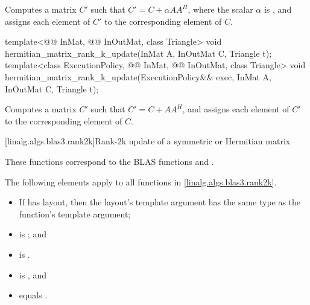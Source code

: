\begin{itemdescr}
\pnum
\effects
Computes a matrix $C'$ such that $C' = C + \alpha A A^H$,
where the scalar $\alpha$ is ,
and assigns each element of $C'$ to the corresponding element of $C$.
\end{itemdescr}

\begin{itemdecl}
template<@@ InMat, @@ InOutMat, class Triangle>
  void hermitian_matrix_rank_k_update(InMat A, InOutMat C, Triangle t);
template<class ExecutionPolicy,
         @@ InMat, @@ InOutMat, class Triangle>
  void hermitian_matrix_rank_k_update(ExecutionPolicy&& exec,
                                      InMat A, InOutMat C, Triangle t);
\end{itemdecl}

\begin{itemdescr}
\pnum
\effects
Computes a matrix $C'$ such that $C' = C + A A^H$, and
assigns each element of $C'$ to the corresponding element of $C$.
\end{itemdescr}

[linalg.algs.blas3.rank2k]{Rank-2k update of a symmetric or Hermitian matrix}

\pnum
\begin{note}
These functions correspond to the BLAS functions
 and \supercite{blas3}.
\end{note}

\pnum
The following elements apply to all functions in \ref{linalg.algs.blas3.rank2k}.

\pnum
\mandates
\begin{itemize}
\item
If  has  layout,
then the layout's  template argument has
the same type as the function's  template argument;
\item
{}
is ; and
\item
{}
is .
\end{itemize}

\pnum
\expects
\begin{itemize}
\item
{} is , and
\item
{} equals .
\end{itemize}

